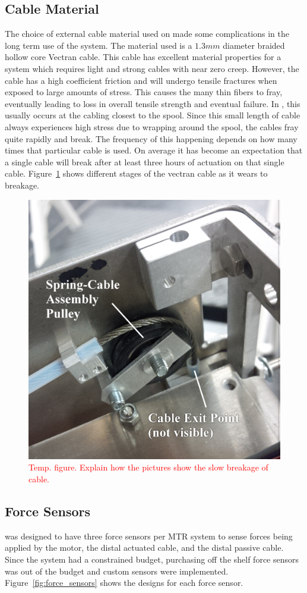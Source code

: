 \begin{appendices}
\subsection{Cable Material}
The choice of external cable material used on \SB{} made some complications in the long term use of the system.
The material used is a \(1.3mm\) diameter braided hollow core Vectran cable.
This cable has excellent material properties for a system which requires light and strong cables with near zero creep.
However, the cable has a high coefficient friction and will undergo tensile fractures when exposed to large amounts of stress.
This causes the many thin fibers to fray, eventually leading to loss in overall tensile strength and eventual failure. 
In \SB{}, this usually occurs at the cabling closest to the spool. 
Since this small length of cable always experiences high stress due to wrapping around the spool, the cables fray quite rapidly and break.
The frequency of this happening depends on how many times that particular cable is used.
On average it has become an expectation that a single cable will break after at least three hours of actuation on that single cable. 
Figure~\ref{fig:cable_break} shows different stages of the vectran cable as it wears to breakage.

\begin{figure}[thpb]
      \centering
      \includegraphics[width=0.6\columnwidth]{tex/img/cable_pulley_bearing_labelled_fixedfonts}
      \caption{\textcolor{red}{Temp. figure. Explain how the pictures show the slow breakage of cable.}}
      \label{fig:cable_break}
\end{figure}

\subsection{Force Sensors}
\label{force_sensing_failure}
\SB{} was designed to have three force sensors per MTR system to sense forces being applied by the motor, the distal actuated cable, and the distal passive cable.
Since the system had a constrained budget, purchasing off the shelf force sensors was out of the budget and custom sensors were implemented.
Figure~\ref{fig:force_sensors} shows the designs for each force sensor.


\end{appendices}
